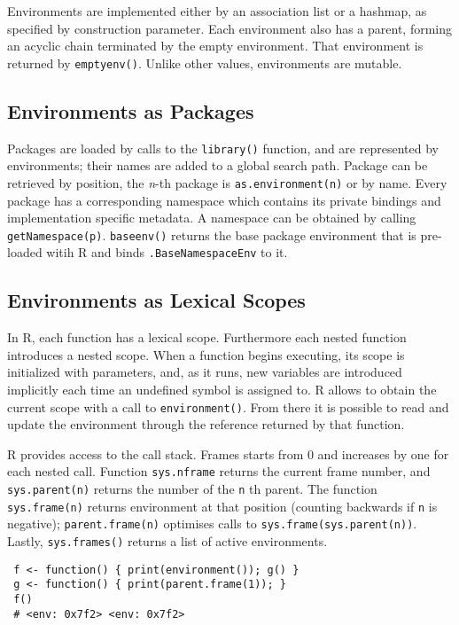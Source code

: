 \documentclass[10pt,review,sigplan,authorversion=true]{acmart}
\newcommand{\code}[1]{\lstinline |#1|\xspace}
\begin{document}
Environments are implemented either by an association list or a hashmap, as
specified by construction parameter. Each environment also has a parent, forming
an acyclic chain terminated by the empty environment. That environment is
returned by \code{emptyenv()}. Unlike other values, environments are mutable.

\subsection{Environments as Packages}

Packages are loaded by calls to the \code{library()} function, and are
represented by environments; their names are added to a global search path.
Package can be retrieved by position, the \emph{n}-th package is
\code{as.environment(n)} or by name. Every package has a corresponding namespace
which contains its private bindings and implementation specific metadata. A
namespace can be obtained by calling \code{getNamespace(p)}. \code{baseenv()}
returns the base package environment that is pre-loaded witih R and binds
\code{.BaseNamespaceEnv} to it.


\subsection{Environments as Lexical Scopes}

In R, each function has a lexical scope. Furthermore each nested function
introduces a nested scope. When a function begins executing, its scope is
initialized with parameters, and, as it runs, new variables are introduced
implicitly each time an undefined symbol is assigned to. R allows to obtain the
current scope with a call to \code{environment()}. From there it is possible to
read and update the environment through the reference returned by that function.

R provides access to the call stack. Frames starts from 0 and increases by one
for each nested call. Function \code{sys.nframe} returns the current frame
number, and \code{sys.parent(n)} returns the number of the \code{n}th parent.
The function \code{sys.frame(n)} returns environment at that position (counting
backwards if \code{n} is negative); \code{parent.frame(n)} optimises calls to
\code{sys.frame(sys.parent(n))}. Lastly, \code{sys.frames()} returns a list of
active environments.

\begin{lstlisting}
 f <- function() { print(environment()); g() }
 g <- function() { print(parent.frame(1)); }
 f()
 # <env: 0x7f2> <env: 0x7f2>
\end{lstlisting}
\end{document}
